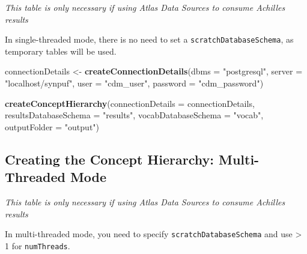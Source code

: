 \documentclass[]{article}
\newenvironment{Shaded}{\begin{snugshade}}{\end{snugshade}}
\newcommand{\KeywordTok}[1]{\textcolor[rgb]{0.13,0.29,0.53}{\textbf{#1}}}
\newcommand{\DataTypeTok}[1]{\textcolor[rgb]{0.13,0.29,0.53}{#1}}
\newcommand{\StringTok}[1]{\textcolor[rgb]{0.31,0.60,0.02}{#1}}
\newcommand{\NormalTok}[1]{#1}
\begin{document}
\emph{This table is only necessary if using Atlas Data Sources to
consume Achilles results}

In single-threaded mode, there is no need to set a
\texttt{scratchDatabaseSchema}, as temporary tables will be used.

\begin{Shaded}
\begin{Highlighting}[]
\NormalTok{connectionDetails <-}\StringTok{ }\KeywordTok{createConnectionDetails}\NormalTok{(}\DataTypeTok{dbms =} \StringTok{"postgresql"}\NormalTok{, }
                                             \DataTypeTok{server =} \StringTok{"localhost/synpuf"}\NormalTok{, }
                                             \DataTypeTok{user =} \StringTok{"cdm_user"}\NormalTok{, }
                                             \DataTypeTok{password =} \StringTok{"cdm_password"}\NormalTok{)}

\KeywordTok{createConceptHierarchy}\NormalTok{(}\DataTypeTok{connectionDetails =}\NormalTok{ connectionDetails, }
                       \DataTypeTok{resultsDatabaseSchema =} \StringTok{"results"}\NormalTok{, }
                       \DataTypeTok{vocabDatabaseSchema =} \StringTok{"vocab"}\NormalTok{, }
                       \DataTypeTok{outputFolder =} \StringTok{"output"}\NormalTok{)}
\end{Highlighting}
\end{Shaded}

\subsection{Creating the Concept Hierarchy: Multi-Threaded
Mode}\label{creating-the-concept-hierarchy-multi-threaded-mode}

\emph{This table is only necessary if using Atlas Data Sources to
consume Achilles results}

In multi-threaded mode, you need to specify
\texttt{scratchDatabaseSchema} and use \textgreater{} 1 for
\texttt{numThreads}.
\end{document}
